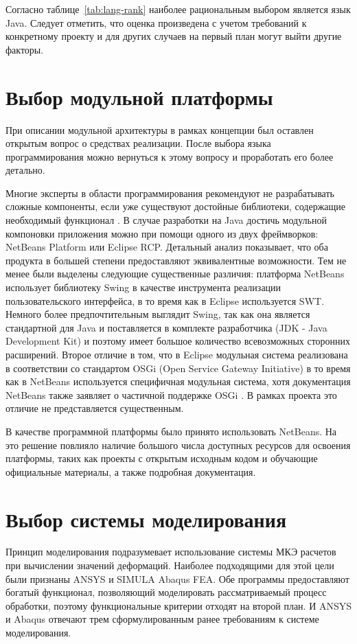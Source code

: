 \documentclass[14pt,oneside,final]{extreport}
\begin{document}
	Согласно таблице~\ref{tab:lang-rank} наиболее рациональным выбором является язык Java. Следует отметить, что оценка произведена с учетом требований к конкретному проекту и для других случаев на первый план могут выйти другие факторы.
	
	\section{Выбор модульной платформы}
	При описании модульной архитектуры в рамках концепции был оставлен открытым вопрос о средствах реализации. После выбора языка программирования можно вернуться к этому вопросу и проработать его более детально. 
	
	Многие эксперты в области программирования рекомендуют не разрабатывать сложные компоненты, если уже существуют достойные библиотеки, содержащие необходимый функционал \cite{Bloch}. В случае разработки на Java достичь модульной компоновки приложения можно при помощи одного из двух фреймворков: NetBeans Platform или Eclipse RCP. Детальный анализ показывает, что оба продукта в большей степени предоставляют эквивалентные возможности. Тем не менее были выделены следующие существенные различия: платформа NetBeans использует библиотеку Swing в качестве инструмента реализации пользовательского интерфейса, в то время как в Eclipse используется SWT. Немного более предпочтительным выглядит Swing, так как она является стандартной для Java и поставляется в комплекте разработчика (JDK - Java Development Kit) и поэтому имеет большое количество всевозможных сторонних расширений. Второе отличие в том, что в Eclipse модульная система реализована в соответствии со стандартом OSGi (Open Service Gateway Initiative) в то время как в NetBeans используется специфичная модульная система, хотя документация NetBeans также заявляет о частичной поддержке OSGi \cite{book:NetBeans}. В рамках проекта это отличие не представляется существенным. 
	
	В качестве программной платформы  было принято использовать NetBeans. На это решение повлияло наличие большого числа доступных ресурсов для освоения платформы, таких как проекты с открытым исходным кодом и обучающие официальные материалы, а также подробная документация.

	\section{Выбор системы моделирования}
	Принцип моделирования подразумевает использование системы МКЭ расчетов при вычислении значений деформаций. Наиболее подходящими для этой цели были признаны ANSYS и SIMULA Abaqus FEA. Обе программы предоставляют богатый функционал, позволяющий моделировать рассматриваемый процесс обработки, поэтому функциональные критерии отходят на второй план. И ANSYS и Abaqus отвечают трем сформулированным ранее требованиям к системе моделирования. 
	
\end{document}
